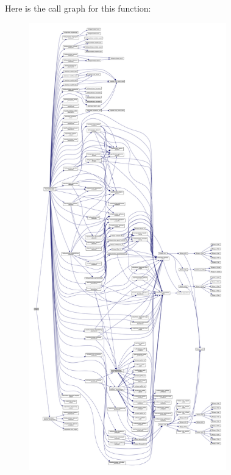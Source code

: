Here is the call graph for this function\+:
\nopagebreak
\begin{figure}[H]
\begin{center}
\leavevmode
\includegraphics[height=550pt]{main_8f90_a8ec2266d83cd6c0b762cbcbc92c0af3d_cgraph}
\end{center}
\end{figure}
